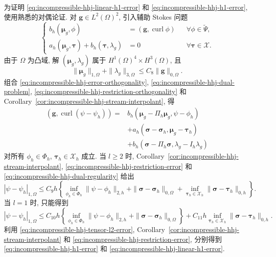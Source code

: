 \begin{Proof}
为证明 \eqref{eq:incompressible-hhj-linear-h1-error}
和 \eqref{eq:incompressible-hhj-h1-error}, 使用熟悉的对偶论证.
对 $\mathbf g\in L^2(\Omega)^2$, 引入辅助 Stokes 问题
\begin{equation}\label{eq:incompressible-hhj-dual-problem}
\left\{
\begin{aligned}
b_h(\boldsymbol\mu_g,\phi)&=(\mathbf g,\operatorname{curl}\phi)
&&\forall\phi\in\widetilde\Psi,\\
a_h(\boldsymbol\mu_g,\boldsymbol\tau)
+b_h(\boldsymbol\tau,\lambda_g)&=0
&&\forall\boldsymbol\tau\in\mathcal X.
\end{aligned}
\right.
\end{equation}
由于 $\Omega$ 为凸域, 解
$(\boldsymbol\mu_g,\lambda_g)$ 属于
$H^1(\Omega)^4\times H^3(\Omega)$, 且
\begin{equation}\label{eq:incompressible-hhj-dual-regularity}
\|\boldsymbol\mu_g\|_{1,\Omega}
+\|\lambda_g\|_{3,\Omega}
\leq C_8\|\mathbf g\|_{0,\Omega}.
\end{equation}
组合
\eqref{eq:incompressible-hhj-error-orthogonality},
\eqref{eq:incompressible-hhj-dual-problem},
\eqref{eq:incompressible-hhj-restriction-orthogonality}
和 Corollary~\ref{cor:incompressible-hhj-stream-interpolant}, 得
\[
\begin{split}
(\mathbf g,\operatorname{curl}(\psi-\psi_h))
={}&b_h(\boldsymbol\mu_g-\Pi_h\boldsymbol\mu_g,
\psi-\phi_h)\\
&+a_h(\boldsymbol\sigma-\boldsymbol\sigma_h,
\boldsymbol\mu_g-\boldsymbol\tau_h)\\
&+b_h(\boldsymbol\sigma-\Pi_h\boldsymbol\sigma,
\lambda_g-I_h\lambda_g)
\end{split}
\]
对所有 $\phi_h\in\Phi_h$,
$\boldsymbol\tau_h\in\mathcal X_h$ 成立.
当 $l\geq2$ 时, Corollary~\ref{cor:incompressible-hhj-stream-interpolant},
\eqref{eq:incompressible-hhj-restriction-error}
和 \eqref{eq:incompressible-hhj-dual-regularity} 给出
\begin{equation}\label{eq:incompressible-hhj-h1-duality-bound}
|\psi-\psi_h|_{1,\Omega}
\leq C_9h\left\{
\inf_{\phi_h\in\Phi_h}\|\psi-\phi_h\|_{2,h}
+\|\boldsymbol\sigma-\boldsymbol\sigma_h\|_{0,\Omega}
+\inf_{\boldsymbol\tau_h\in\mathcal X_h}
\|\boldsymbol\sigma-\boldsymbol\tau_h\|_{0,h}
\right\}.
\end{equation}
当 $l=1$ 时, 只能得到
\begin{equation}\label{eq:incompressible-hhj-linear-h1-duality-bound}
|\psi-\psi_h|_{1,\Omega}
\leq C_{10}h
\left\{
\inf_{\phi_h\in\Phi_h}\|\psi-\phi_h\|_{2,h}
+\|\boldsymbol\sigma-\boldsymbol\sigma_h\|_{0,\Omega}
\right\}
+C_{11}h
\inf_{\boldsymbol\tau_h\in\mathcal X_h}
\|\boldsymbol\sigma-\boldsymbol\tau_h\|_{0,h}.
\end{equation}
利用 \eqref{eq:incompressible-hhj-tensor-l2-error},
Corollary~\ref{cor:incompressible-hhj-stream-interpolant}
和 \eqref{eq:incompressible-hhj-restriction-error},
分别得到
\eqref{eq:incompressible-hhj-h1-error}
和 \eqref{eq:incompressible-hhj-linear-h1-error}.
\end{Proof}


